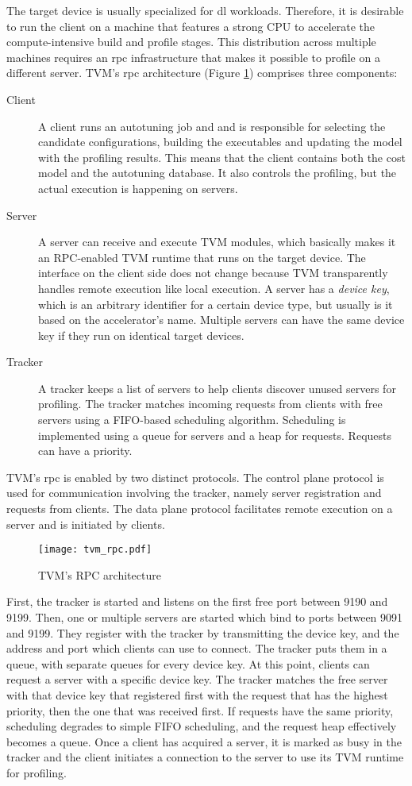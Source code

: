 The target device is usually specialized for \gls{dl} workloads. Therefore, it is desirable to run the client on a machine that features a strong CPU to accelerate the compute-intensive build and profile stages. This distribution across multiple machines requires an \gls{rpc} infrastructure that makes it possible to profile on a different server. TVM's \gls{rpc} architecture (Figure \ref{fig:tvm-rpc}) comprises three components:
\begin{description}
	\item[Client] A client runs an autotuning job and and is responsible for selecting the candidate configurations, building the executables and updating the model with the profiling results. This means that the client contains both the cost model and the autotuning database. It also controls the profiling, but the actual execution is happening on servers.
	\item[Server] A server can receive and execute TVM modules, which basically makes it an RPC-enabled TVM runtime that runs on the target device. The interface on the client side does not change because TVM transparently handles remote execution like local execution. A server has a \textit{device key}, which is an arbitrary identifier for a certain device type, but usually is it based on the accelerator's name. Multiple servers can have the same device key if they run on identical target devices.
	\item[Tracker] A tracker keeps a list of servers to help clients discover unused servers for profiling. The tracker matches incoming requests from clients with free servers using a FIFO-based scheduling algorithm. Scheduling is implemented using a queue for servers and a heap for requests. Requests can have a priority.
\end{description}
TVM's \gls{rpc} is enabled by two distinct protocols. The control plane protocol is used for communication involving the tracker, namely server registration and requests from clients. The data plane protocol facilitates remote execution on a server and is initiated by clients.

\begin{figure}
	\centering
	\texttt{[image: tvm\_rpc.pdf]}%
	\caption{TVM's RPC architecture}
	\label{fig:tvm-rpc}
\end{figure}

First, the tracker is started and listens on the first free port between 9190 and 9199. Then, one or multiple servers are started which bind to ports between 9091 and 9199. They register with the tracker by transmitting the device key, and the address and port which clients can use to connect. The tracker puts them in a queue, with separate queues for every device key. At this point, clients can request a server with a specific device key. The tracker matches the free server with that device key that registered first with the request that has the highest priority, then the one that was received first. If requests have the same priority, scheduling degrades to simple FIFO scheduling, and the request heap effectively becomes a queue. Once a client has acquired a server, it is marked as busy in the tracker and the client initiates a connection to the server to use its TVM runtime for profiling.

